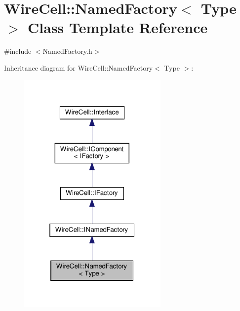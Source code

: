 \hypertarget{class_wire_cell_1_1_named_factory}{}\section{Wire\+Cell\+:\+:Named\+Factory$<$ Type $>$ Class Template Reference}
\label{class_wire_cell_1_1_named_factory}


{\ttfamily \#include $<$Named\+Factory.\+h$>$}



Inheritance diagram for Wire\+Cell\+:\+:Named\+Factory$<$ Type $>$\+:
\nopagebreak
\begin{figure}[H]
\begin{center}
\leavevmode
\includegraphics[width=208pt]{class_wire_cell_1_1_named_factory__inherit__graph}
\end{center}
\end{figure}


